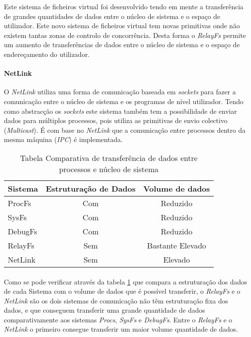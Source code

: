 Este sistema de ficheiros virtual foi desenvolvido tendo em mente a transferência de grandes quantidades de dados entre o núcleo de sistema e o espaço de utilizador. Este novo sistema de ficheiros virtual tem novas primitivas onde não existem tantas zonas de controlo de concorrência. Desta forma o \textit{RelayFs} permite um aumento de transferências de dados entre o núcleo de sistema e o espaço de endereçamento do utilizador\cite{Donovan2007}.

\paragraph*{NetLink}\label{cap:NetLink_overview}
O \textit{NetLink} utiliza uma forma de comunicação baseada em \textit{sockets} para fazer a comunicação entre o núcleo de sistema e os programas de nível utilizador. Tendo como abstracção os \textit{sockets} este sistema também tem a possibilidade de enviar dados para múltiplos processos, pois utiliza as primitivas de envio colectivo (\textit{Multicast}). 
É com base no \textit{NetLink} que a comunicação entre processos dentro da mesma máquina (\textit{IPC}) é implementada.

\begin{table}[h]
\begin{center}

\begin{tabular}{|l||c|c|}
\hline
Sistema & Estruturação de Dados & Volume de dados \\
\hline
ProcFs & Com & Reduzido \\
\hline
SysFs & Com & Reduzido \\
\hline
DebugFs & Com & Reduzido \\
\hline
RelayFs & Sem & Bastante Elevado \\
\hline
NetLink & Sem & Elevado \\
\hline
\end{tabular}
\caption{Tabela Comparativa de transferência de dados entre processos e núcleo de sistema}
\label{tab:transf_compare}
\end{center}
\end{table}

\paragraph*{}
Como se pode verificar através da tabela \ref{tab:transf_compare} que compara a estruturação dos dados de cada Sistema com o volume de dados que é possível transferir, o \textit{RelayFs} e o \textit{NetLink} são os dois sistemas de comunicação não têm estruturação fixa dos dados, e que conseguem transferir uma grande quantidade de dados comparativamente aos sistemas \textit{Procs}, \textit{SysFs} e \textit{DebugFs}. Entre o \textit{RelayFs} e o \textit{NetLink} o primeiro consegue transferir um maior volume quantidade de dados.

